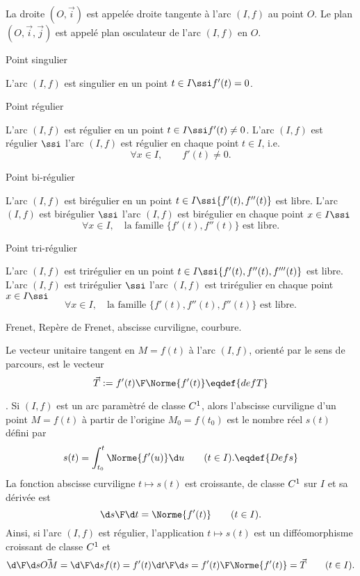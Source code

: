 \Definition 
La droite $(O,\vec i)$ est appelée droite tangente à l'arc $(I,f)$ au point $O$. \PAR\noindent
Le plan $(O,\vec i,\vec j)$ est appelé plan osculateur de l'arc $(I,f)$ en $O$. 

\Concept Point singulier

L'arc $(I,f)$ est singulier en un point $t\in I \ssi f'(t)=0$. 

\Concept Point régulier

L'arc $(I,f)$ est régulier en un point $t\in I \ssi f'(t)\neq 0$. \PAR\noindent
L'arc $(I,f)$ est régulier $\ssi$ l'arc $(I,f)$ est régulier en chaque point $t\in I$, i.e. 
$$
\forall x\in I, \qquad f'(t)\neq 0.
$$

\Concept Point bi-régulier

L'arc $(I,f)$ est birégulier en un point $t\in I\ssi\{f'(t), f''(t)\}$ est libre. \medskip\noindent 
L'arc $(I,f)$ est birégulier $\ssi$ l'arc $(I,f)$ est birégulier en chaque point $x\in I\ssi$
$$
\forall x\in I,\quad \mbox{la famille }\{f'(t),f''(t)\} \mbox{ est libre}.
$$

\Concept Point tri-régulier

L'arc $(I,f)$ est trirégulier en un point $t\in I\ssi\{f'(t), f''(t),f'''(t)\}$ est libre. \medskip\noindent
L'arc $(I,f)$ est trirégulier $\ssi$ l'arc $(I,f)$ est trirégulier en chaque point $x\in I\ssi$
$$
\forall x\in I,\quad \mbox{la famille }\{f'(t),f''(t),f''(t)\} \mbox{ est libre}.
$$

%

\Subsection Frenet, Repère de Frenet, abscisse curviligne, courbure.

Le vecteur unitaire tangent en $M=f(t)$ à l'arc $(I,f)$, orienté par le sens de parcours, est le vecteur 
$$
\vec T:={f'(t)\F\Norme{f'(t)}}\eqdef{defT}
$$

\Rappels. Si $(I,f)$ est un arc paramètré de classe $\sc C^1$, alors l'abscisse curviligne d'un point $M=f(t)$ à partir de l'origine $M_0=f(t_0)$ 
est le nombre réel $s(t)$ défini par 
$$
s(t)=\int_{t_0}^t\Norme{f'(u)}\d u\qquad (t\in I). \eqdef{Defs}
$$
La fonction abscisse curviligne $t\mapsto s(t)$ est croissante, de classe $\sc C^1$ sur $I$ et sa dérivée est 
$$
{\d s\F\d t}=\Norme{f'(t)}\qquad(t\in I).
$$
Ainsi, si l'arc $(I,f)$ est régulier, l'application $t\mapsto s(t)$ est un difféomorphisme croissant de classe $\sc C^1$ et 
$$
{\d\F\d s}\vec{OM}={\d \F\d s}f(t)=f'(t){\d t\F\d s}={f'(t)\F\Norme{f'(t)}}=\vec T\qquad (t\in I).
$$




